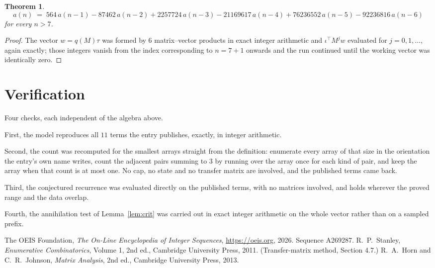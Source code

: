 \documentclass[11pt,a4paper]{article}
\theoremstyle{plain}
\newtheorem{theorem}{Theorem}
\theoremstyle{definition}
\begin{document}
\begin{theorem}
\[
a(n)\;=\;564\,a(n-1) - 87462\,a(n-2) + 2257724\,a(n-3) - 21169617\,a(n-4) + 76236552\,a(n-5) - 92236816\,a(n-6)
\]
for every $n>7$.
\end{theorem}

\begin{proof}
The vector $w=q(M)\tau$ was formed by $6$ matrix--vector products in exact integer
arithmetic and $\iota^{\!\top}M^{j}w$ evaluated for $j=0,1,\dots$, again exactly; those
integers vanish from the index corresponding to $n=7+1$ onwards and the run continued
until the working vector was identically zero.
\end{proof}

\section{Verification}

Four checks, each independent of the algebra above.

First, the model reproduces all $11$ terms the entry publishes, exactly, in integer
arithmetic.

Second, the count was recomputed for the smallest arrays straight from the definition:
enumerate every array of that size in the orientation the entry's own name writes, count the
adjacent pairs summing to $3$ by running over the array once for each kind of pair, and keep
the array when that count is at most one. No cap, no state and no transfer matrix are involved, and
the published terms came back.

Third, the conjectured recurrence was evaluated directly on the published terms, with no
matrices involved, and holds wherever the proved range and the data overlap.

Fourth, the annihilation test of Lemma~\ref{lem:crit} was carried out in exact integer
arithmetic on the whole vector rather than on a sampled prefix.

\begin{thebibliography}{9}
 The OEIS Foundation, \emph{The On-Line Encyclopedia of Integer
Sequences}, \url{https://oeis.org}, 2026. Sequence A269287.
 R.~P.~Stanley, \emph{Enumerative Combinatorics}, Volume 1, 2nd ed.,
Cambridge University Press, 2011. (Transfer-matrix method, Section 4.7.)
 R.~A.~Horn and C.~R.~Johnson, \emph{Matrix Analysis}, 2nd ed., Cambridge
University Press, 2013.
\end{thebibliography}
\end{document}
